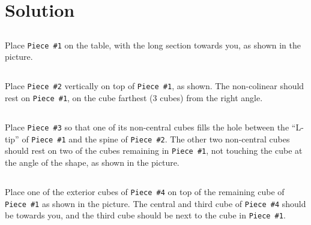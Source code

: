 \documentclass[11pt, twoside]{article}
\begin{document}
  \clearpage

  \section{Solution}
    \subsection{}
      Place \texttt{Piece \#1} on the table, with the long section towards you, as shown in the picture.

      \begin{center}
      \end{center}

    \subsection{}
      Place \texttt{Piece \#2} vertically on top of \texttt{Piece \#1}, as shown. The non-colinear should rest
        on \texttt{Piece \#1}, on the cube farthest (3 cubes) from the right angle.

      \begin{center}
      \end{center}

    \subsection{}
      Place \texttt{Piece \#3} so that one of its non-central cubes fills the hole between the ``L-tip''
        of \texttt{Piece \#1} and the spine of \texttt{Piece \#2}. The other two non-central cubes should
        rest on two of the cubes remaining in \texttt{Piece \#1}, not touching the cube at the angle of the
        shape, as shown in the picture.

      \begin{center}
      \end{center}

    \clearpage
    \subsection{}
      Place one of the exterior cubes of \texttt{Piece \#4} on top of the remaining cube of \texttt{Piece \#1}
        as shown in the picture. The central and third cube of \texttt{Piece \#4} should be towards you, and
        the third cube should be next to the cube in \texttt{Piece \#1}.
\end{document}
